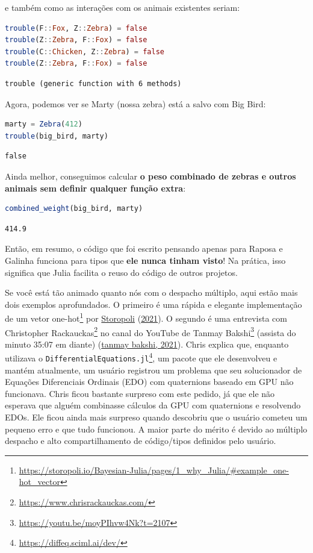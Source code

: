 \documentclass[
  notoc %
]{tufte-book}
\DeclareRobustCommand{\href}[2]{#2\footnote{\url{#1}}}
\newcommand{\passthrough}[1]{#1}
\begin{document}
e também como as interações com os animais existentes seriam:

\begin{lstlisting}[language=Julia]
trouble(F::Fox, Z::Zebra) = false
trouble(Z::Zebra, F::Fox) = false
trouble(C::Chicken, Z::Zebra) = false
trouble(Z::Zebra, F::Fox) = false
\end{lstlisting}

\begin{lstlisting}[language=Output]
trouble (generic function with 6 methods)
\end{lstlisting}

Agora, podemos ver se Marty (nossa zebra) está a salvo com Big Bird:

\begin{lstlisting}[language=Julia]
marty = Zebra(412)
trouble(big_bird, marty)
\end{lstlisting}

\begin{lstlisting}[language=Output]
false
\end{lstlisting}

Ainda melhor, conseguimos calcular \textbf{o peso combinado de zebras e
outros animais sem definir qualquer função extra}:

\begin{lstlisting}[language=Julia]
combined_weight(big_bird, marty)
\end{lstlisting}

\begin{lstlisting}[language=Output]
414.9
\end{lstlisting}

Então, em resumo, o código que foi escrito pensando apenas para Raposa e
Galinha funciona para tipos que \textbf{ele nunca tinham visto}! Na
prática, isso significa que Julia facilita o reuso do código de outros
projetos.

Se você está tão animado quanto nós com o despacho múltiplo, aqui estão
mais dois exemplos aprofundados. O primeiro é uma
\href{https://storopoli.io/Bayesian-Julia/pages/1_why_Julia/\#example_one-hot_vector}{rápida
e elegante implementação de um vetor one-hot} por
\protect\hyperlink{ref-storopoli2021bayesianjulia}{Storopoli}
(\protect\hyperlink{ref-storopoli2021bayesianjulia}{2021}). O segundo é
uma entrevista com \href{https://www.chrisrackauckas.com/}{Christopher
Rackauckas} no \href{https://youtu.be/moyPIhvw4Nk?t=2107}{canal do
YouTube de Tanmay Bakshi} (assista do minuto 35:07 em diante)
(\protect\hyperlink{ref-tanmaybakshiBakingKnowledgeMachine2021}{tanmay
bakshi, 2021}). Chris explica que, enquanto utilizava o
\href{https://diffeq.sciml.ai/dev/}{\passthrough{\lstinline!DifferentialEquations.jl!}},
um pacote que ele desenvolveu e mantém atualmente, um usuário registrou
um problema que seu solucionador de Equações Diferenciais Ordinais (EDO)
com quaternions baseado em GPU não funcionava. Chris ficou bastante
surpreso com este pedido, já que ele não esperava que alguém combinasse
cálculos da GPU com quaternions e resolvendo EDOs. Ele ficou ainda mais
surpreso quando descobriu que o usuário cometeu um pequeno erro e que
tudo funcionou. A maior parte do mérito é devido ao múltiplo despacho e
alto compartilhamento de código/tipos definidos pelo usuário.
\end{document}
